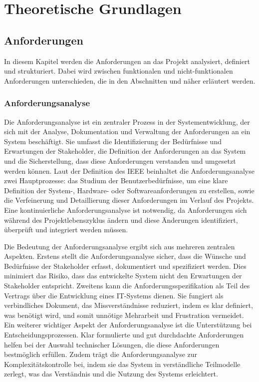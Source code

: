 


\chapter{Theoretische Grundlagen} \label{theoretische_grundlagen}

\section{Anforderungen} \label{Anforderungen}
In diesem Kapitel werden die Anforderungen an das Projekt analysiert, definiert und strukturiert. Dabei wird zwischen funktionalen und nicht-funktionalen Anforderungen unterschieden, die in den Abschnitten  und  näher erläutert werden.
\subsection{Anforderungsanalyse}
Die Anforderungsanalyse ist ein zentraler Prozess in der Systementwicklung, der sich mit der Analyse, Dokumentation und Verwaltung der Anforderungen an ein System beschäftigt. Sie umfasst die Identifizierung der Bedürfnisse und Erwartungen der Stakeholder, die Definition der Anforderungen an das System und die Sicherstellung, dass diese Anforderungen verstanden und umgesetzt werden können. Laut der Definition des \ac{IEEE} beinhaltet die Anforderungsanalyse zwei Hauptprozesse: das Studium der Benutzerbedürfnisse, um eine klare Definition der System-, Hardware- oder Softwareanforderungen zu erstellen, sowie die Verfeinerung und Detaillierung dieser Anforderungen im Verlauf des Projekts. Eine kontinuierliche Anforderungsanalyse ist notwendig, da Anforderungen sich während des Projektlebenszyklus ändern und diese Änderungen identifiziert, überprüft und integriert werden müssen. 

Die Bedeutung der Anforderungsanalyse ergibt sich aus mehreren zentralen Aspekten.
 Erstens stellt die Anforderungsanalyse sicher, dass die Wünsche und Bedürfnisse der
 Stakeholder erfasst, dokumentiert und spezifiziert werden. Dies minimiert das Risiko, dass
 das entwickelte System nicht den Erwartungen der Stakeholder entspricht. Zweitens kann
 die Anforderungsspezifikation als Teil des Vertrags über die Entwicklung eines IT-Systems
 dienen. Sie fungiert als verbindliches Dokument, das Missverständnisse reduziert, indem
 es klar definiert, was benötigt wird, und somit unnötige Mehrarbeit und Frustration
 vermeidet. Ein weiterer wichtiger Aspekt der Anforderungsanalyse ist die Unterstützung
 bei Entscheidungsprozessen. Klar formulierte und gut durchdachte Anforderungen helfen
 bei der Auswahl technischer Lösungen, die diese Anforderungen bestmöglich erfüllen.
 Zudem trägt die Anforderungsanalyse zur Komplexitätskontrolle bei, indem sie das System
 in verständliche Teilmodelle zerlegt, was das Verständnis und die Nutzung des Systems
 erleichtert. 

